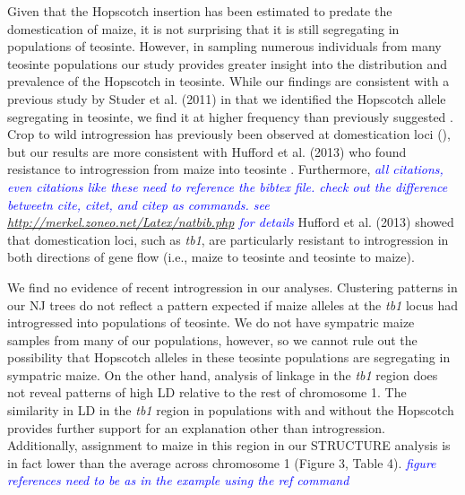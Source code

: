 \documentclass[12pt]{article}
\newcommand{\jri}[1]{\textcolor{blue}{ \emph{\scriptsize  #1}} }
\begin{document}
Given that the Hopscotch insertion has been estimated to predate the domestication of maize, it is not surprising that it is still segregating in populations of teosinte. However, in sampling numerous individuals from many teosinte populations our study provides greater insight into the distribution and prevalence of the Hopscotch in teosinte. While our findings are consistent with a previous study by Studer et al. (2011) in that we identified the Hopscotch allele segregating in teosinte, we find it at higher frequency than previously suggested \cite{Studer et al 2011}. Crop to wild introgression has previously been observed at domestication loci (\cite{Ellstrand et al 1999, Zhang et al 2009, Thurber et al 2010, Baack et al 2008, Hubner et al 2012, Wilkes et al 1977, Van Heerwaarden et al 2011, Barrett 1983}), but our results are more consistent with Hufford et al. (2013) who found resistance to introgression from maize into teosinte \cite{Hufford et al 2013}. Furthermore, \jri{all citations, even citations like these need to reference the bibtex file. check out the difference betweetn cite, citet, and citep as commands. see \url{http://merkel.zoneo.net/Latex/natbib.php} for details} Hufford et al. (2013) showed that domestication loci, such as \emph{tb1}, are particularly resistant to introgression in both directions of gene flow (i.e., maize to teosinte and teosinte to maize). 

We find no evidence of recent introgression in our analyses. Clustering patterns in our NJ trees do not reflect a pattern expected if maize alleles at the \emph{tb1} locus had introgressed into populations of teosinte. We do not have sympatric maize samples from many of our populations, however, so we cannot rule out the possibility that Hopscotch alleles in these teosinte populations are segregating in sympatric maize. On the other hand, analysis of linkage in the \emph{tb1} region does not reveal patterns of high LD relative to the rest of chromosome 1. The similarity in LD in the \emph{tb1} region in populations with and without the Hopscotch provides further support for an explanation other than introgression. Additionally, assignment to maize in this region in our STRUCTURE analysis is in fact lower than the average across chromosome 1 (Figure 3, Table 4). \jri{figure references need to be as in the example using the ref command}
\end{document}
